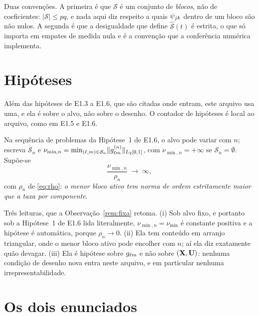 \documentclass[11pt,a4paper]{article}
\newcommand{\Shat}{\widehat{\mathcal{S}}}
\newcommand{\sepmin}{\nu_{\min}}
\newcommand{\sepminn}{\nu_{\min,n}}
\newcommand{\rn}{\rho}
\begin{document}
Duas convenções. A primeira é que $\mathcal{S}$ é um conjunto de \emph{blocos}, não de
coeficientes: $|\mathcal{S}| \le pq$, e nada aqui diz respeito a quais
$\psi_{jk}$ dentro de um bloco são não nulos. A segunda é que a
desigualdade que define $\Shat(t)$ é estrita, o que só importa em empates de
medida nula e é a convenção que a conferência numérica implementa.

\section{Hipóteses}

Além das hipóteses de E1.3 a E1.6, que são citadas onde entram, este arquivo
usa uma, e ela é sobre o alvo, não sobre o desenho. O contador de hipóteses é
local ao arquivo, como em E1.5 e E1.6.

\begin{assumption}\label{ass:sep}
Na sequência de problemas da Hipótese~1 de E1.6, o alvo pode variar com $n$;
escreva $\mathcal{S}_{n}$ e $\sepminn = \min_{(\cv,\md)\in \mathcal{S}_{n}}
\lVert g^{(n)}_{\cv\md}\rVert_{L_{2}[0,1]}$, com $\sepminn = +\infty$ se
$\mathcal{S}_{n} = \emptyset$. Supõe-se
\[
  \frac{\sepminn}{\rn_{n}} \;\longrightarrow\; \infty ,
\]
com $\rn_{n}$ de \eqref{eq:rho}: \emph{o menor bloco ativo tem norma de ordem
estritamente maior que a taxa por componente}.
\end{assumption}

Três leituras, que a Observação~\ref{rem:fixa} retoma. (i) Sob alvo fixo, e
portanto sob a Hipótese~1 de E1.6 lida literalmente, $\sepminn = \sepmin$ é
constante positiva e a hipótese é automática, porque $\rn_{n}\to 0$. (ii) Ela
tem conteúdo em arranjo triangular, onde o menor bloco ativo pode encolher com
$n$; aí ela diz exatamente quão devagar. (iii) Ela é hipótese sobre
$g_{\ell m}$ e não sobre $(\mathbf{X},\mathbf{U})$: nenhuma condição de desenho nova
entra neste arquivo, e em particular nenhuma irrepresentabilidade.

\section{Os dois enunciados}
\end{document}
